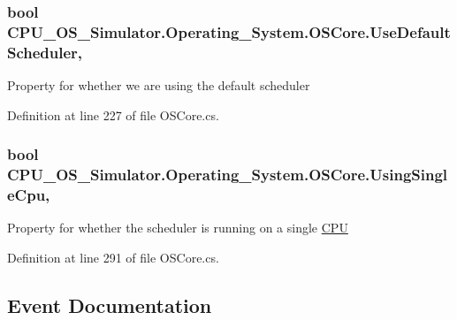 \subsubsection[{Use\+Default\+Scheduler}]{\setlength{\rightskip}{0pt plus 5cm}bool C\+P\+U\+\_\+\+O\+S\+\_\+\+Simulator.\+Operating\+\_\+\+System.\+O\+S\+Core.\+Use\+Default\+Scheduler\hspace{0.3cm}{\ttfamily [get]}, {\ttfamily [set]}}\label{class_c_p_u___o_s___simulator_1_1_operating___system_1_1_o_s_core_a1fd8b54b31fa415f09f2b9bc407802dd}


Property for whether we are using the default scheduler 



Definition at line 227 of file O\+S\+Core.\+cs.

\hypertarget{class_c_p_u___o_s___simulator_1_1_operating___system_1_1_o_s_core_ac965e1317dc5c6b6ae93c410098dd913}{}
\subsubsection[{Using\+Single\+Cpu}]{\setlength{\rightskip}{0pt plus 5cm}bool C\+P\+U\+\_\+\+O\+S\+\_\+\+Simulator.\+Operating\+\_\+\+System.\+O\+S\+Core.\+Using\+Single\+Cpu\hspace{0.3cm}{\ttfamily [get]}, {\ttfamily [set]}}\label{class_c_p_u___o_s___simulator_1_1_operating___system_1_1_o_s_core_ac965e1317dc5c6b6ae93c410098dd913}


Property for whether the scheduler is running on a single \hyperlink{namespace_c_p_u___o_s___simulator_1_1_c_p_u}{C\+P\+U} 



Definition at line 291 of file O\+S\+Core.\+cs.



\subsection{Event Documentation}
\hypertarget{class_c_p_u___o_s___simulator_1_1_operating___system_1_1_o_s_core_abcbb2efff8a4078fae3edb9b31f62198}{}
